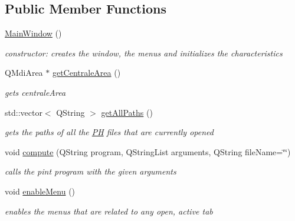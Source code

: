 \subsection*{\-Public \-Member \-Functions}
\begin{DoxyCompactItemize}
\item 
\hypertarget{class_main_window_a34c4b4207b46d11a4100c9b19f0e81bb}{\hyperlink{class_main_window_a34c4b4207b46d11a4100c9b19f0e81bb}{\-Main\-Window} ()}\label{class_main_window_a34c4b4207b46d11a4100c9b19f0e81bb}

\begin{DoxyCompactList}\small\item\em constructor\-: creates the window, the menus and initializes the characteristics \end{DoxyCompactList}\item 
\-Q\-Mdi\-Area $\ast$ \hyperlink{class_main_window_a398296c146bb239d0b75a24b44132658}{get\-Centrale\-Area} ()
\begin{DoxyCompactList}\small\item\em gets centrale\-Area \end{DoxyCompactList}\item 
\hypertarget{class_main_window_a5cc52553f615cb3abeb1198ad8c018a3}{std\-::vector$<$ \-Q\-String $>$ \hyperlink{class_main_window_a5cc52553f615cb3abeb1198ad8c018a3}{get\-All\-Paths} ()}\label{class_main_window_a5cc52553f615cb3abeb1198ad8c018a3}

\begin{DoxyCompactList}\small\item\em gets the paths of all the \hyperlink{class_p_h}{\-P\-H} files that are currently opened \end{DoxyCompactList}\item 
void \hyperlink{class_main_window_a8a30572d7170d0a51737cd4991f0a05f}{compute} (\-Q\-String program, \-Q\-String\-List arguments, \-Q\-String file\-Name=\char`\"{}\char`\"{})
\begin{DoxyCompactList}\small\item\em calls the pint program with the given arguments \end{DoxyCompactList}\item 
void \hyperlink{class_main_window_ac4c3ec77ba5666ff9ef670b4b02c6838}{enable\-Menu} ()
\begin{DoxyCompactList}\small\item\em enables the menus that are related to any open, active tab \end{DoxyCompactList}\end{DoxyCompactItemize}
